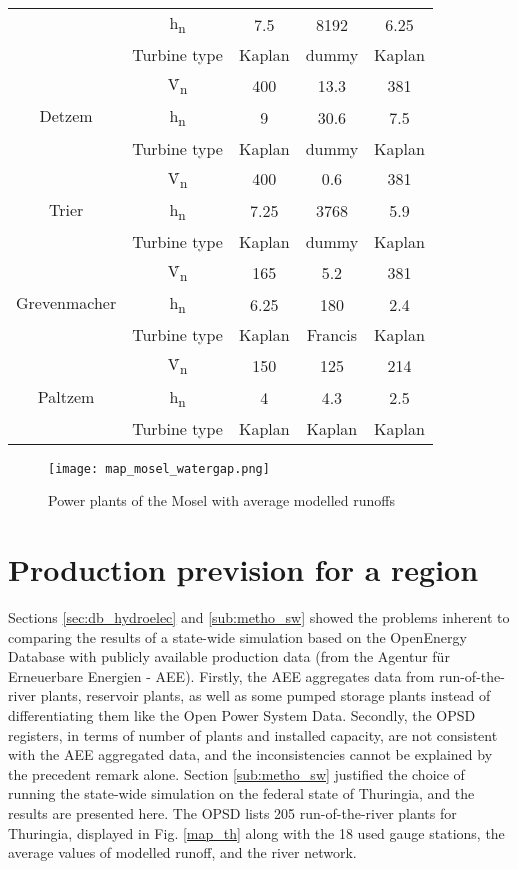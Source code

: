 \begin{longtable}{|c|c|c|c|c|}
  &h\textsubscript{n}&7.5&8192&6.25\\
  &Turbine type&Kaplan&dummy&Kaplan\\
  \hline
  \multirow{3}{*}{Detzem}&\.V\textsubscript{n}&400&13.3&381\\
  &h\textsubscript{n}&9&30.6&7.5\\
  &Turbine type&Kaplan&dummy&Kaplan\\
  \hline
  \multirow{3}{*}{Trier}&\.V\textsubscript{n}&400&0.6&381\\
  &h\textsubscript{n}&7.25&3768&5.9\\
  &Turbine type&Kaplan&dummy&Kaplan\\
  \hline
  \multirow{3}{*}{Grevenmacher}&\.V\textsubscript{n}&165&5.2&381\\
  &h\textsubscript{n}&6.25&180&2.4\\
  &Turbine type&Kaplan&Francis&Kaplan\\
  \hline
  \multirow{3}{*}{Paltzem}&\.V\textsubscript{n}&150&125&214\\
  &h\textsubscript{n}&4&4.3&2.5\\
  &Turbine type&Kaplan&Kaplan&Kaplan\\
\end{longtable}
\endgroup

\begin{figure}[H]
\centering
\texttt{[image: map\_mosel\_watergap.png]}
\caption{Power plants of the Mosel with average modelled runoffs}
\label{map_mosel_watergap}
\end{figure}

\section{Production prevision for a region}
\label{sec:res_th}

Sections \ref{sec:db_hydroelec} and \ref{sub:metho_sw} showed the problems inherent to comparing the results of a state-wide simulation based on the OpenEnergy Database with publicly available production data (from the Agentur für Erneuerbare Energien - AEE). Firstly, the AEE aggregates data from run-of-the-river plants, reservoir plants, as well as some pumped storage plants instead of differentiating them like the Open Power System Data. Secondly, the OPSD registers, in terms of number of plants and installed capacity, are not consistent with the AEE aggregated data, and the inconsistencies cannot be explained by the precedent remark alone. \newline
Section \ref{sub:metho_sw} justified the choice of running the state-wide simulation on the federal state of Thuringia, and the results are presented here. \newline
The OPSD lists 205 run-of-the-river plants for Thuringia, displayed in Fig. \ref{map_th} along with the 18 used gauge stations, the average values of modelled runoff, and the river network.

